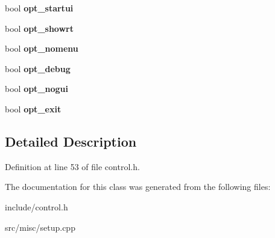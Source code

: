 \begin{DoxyCompactItemize}
\item 
\hypertarget{classConfig_a60d72de7a98e1d1142a21103f3165196}{bool {\bfseries opt\-\_\-startui}}\label{classConfig_a60d72de7a98e1d1142a21103f3165196}

\item 
\hypertarget{classConfig_a0b78abf9471b6a2d04d228be7e6792f2}{bool {\bfseries opt\-\_\-showrt}}\label{classConfig_a0b78abf9471b6a2d04d228be7e6792f2}

\item 
\hypertarget{classConfig_ace74f2fb3b918cc45b2486a59281cafc}{bool {\bfseries opt\-\_\-nomenu}}\label{classConfig_ace74f2fb3b918cc45b2486a59281cafc}

\item 
\hypertarget{classConfig_a7d68ad804907496b417a951ed1eada22}{bool {\bfseries opt\-\_\-debug}}\label{classConfig_a7d68ad804907496b417a951ed1eada22}

\item 
\hypertarget{classConfig_ae904e5c4af1cac4af77feb7af250ad29}{bool {\bfseries opt\-\_\-nogui}}\label{classConfig_ae904e5c4af1cac4af77feb7af250ad29}

\item 
\hypertarget{classConfig_a9f68df279656da4abd730ffa83fbb38a}{bool {\bfseries opt\-\_\-exit}}\label{classConfig_a9f68df279656da4abd730ffa83fbb38a}

\end{DoxyCompactItemize}


\subsection{Detailed Description}


Definition at line 53 of file control.\-h.



The documentation for this class was generated from the following files\-:\begin{DoxyCompactItemize}
\item 
include/control.\-h\item 
src/misc/setup.\-cpp\end{DoxyCompactItemize}

